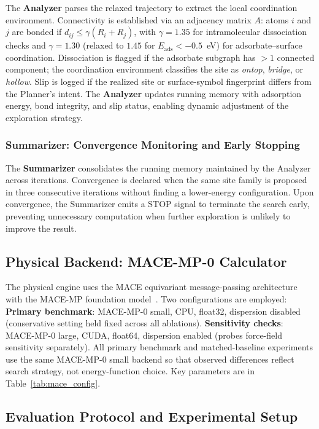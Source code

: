 The \textbf{Analyzer} parses the relaxed trajectory to extract the local coordination environment.
Connectivity is established via an adjacency matrix $A$: atoms $i$ and $j$ are bonded if $d_{ij} \le \gamma(R_i + R_j)$, with $\gamma=1.35$ for intramolecular dissociation checks and $\gamma=1.30$ (relaxed to $1.45$ for $E_{\text{ads}} < -0.5$~eV) for adsorbate--surface coordination.
Dissociation is flagged if the adsorbate subgraph has $>1$ connected component; the coordination environment classifies the site as \textit{ontop}, \textit{bridge}, or \textit{hollow}.
Slip is logged if the realized site or surface-symbol fingerprint differs from the Planner's intent.
The \textbf{Analyzer} updates running memory with adsorption energy, bond integrity, and slip status, enabling dynamic adjustment of the exploration strategy.

\subsubsection{Summarizer: Convergence Monitoring and Early Stopping}

The \textbf{Summarizer} consolidates the running memory maintained by the Analyzer across iterations.
Convergence is declared when the same site family is proposed in three consecutive iterations without finding a lower-energy configuration.
Upon convergence, the Summarizer emits a STOP signal to terminate the search early, preventing unnecessary computation when further exploration is unlikely to improve the result.

\subsection{Physical Backend: MACE-MP-0 Calculator}
\label{sec:mace_config}

The physical engine uses the MACE equivariant message-passing architecture with the MACE-MP foundation model~\cite{batatia2022mace,batatia2023foundation}.
Two configurations are employed:
\textbf{Primary benchmark}: MACE-MP-0 small, CPU, float32, dispersion disabled (conservative setting held fixed across all ablations).
\textbf{Sensitivity checks}: MACE-MP-0 large, CUDA, float64, dispersion enabled (probes force-field sensitivity separately).
All primary benchmark and matched-baseline experiments use the same MACE-MP-0 small backend so that observed differences reflect search strategy, not energy-function choice. Key parameters are in Table~\ref{tab:mace_config}.

\subsection{Evaluation Protocol and Experimental Setup}
\label{sec:eval_setup}

